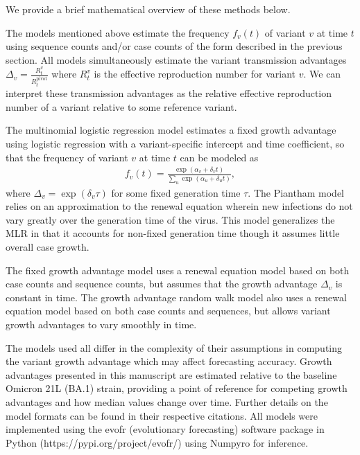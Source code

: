 \documentclass[11pt,oneside,letterpaper]{article}
\begin{document}
We provide a brief mathematical overview of these methods below.

The models mentioned above estimate the frequency  $f_{v}(t)$ of variant $v$ at time $t$ using sequence counts and/or case counts of the form described in the previous section.
All models simultaneously estimate the variant transmission advantages $\Delta_{v} = \frac{R_{t}^{v}}{R_{t}^{\text{pivot}}}$ where $R_{t}^{v}$ is the effective reproduction number for variant $v$.
We can interpret these transmission advantages as the relative effective reproduction number of a variant relative to some reference variant.

The multinomial logistic regression model estimates a fixed growth advantage using logistic regression with a variant-specific intercept and time coefficient, so that the frequency of variant $v$ at time $t$ can be modeled as
\begin{align*}
    f_{v}(t) = \frac{\exp(\alpha_{v} + \delta_{v} t)}{\sum_{u} \exp(\alpha_{u} + \delta_{u} t)},
\end{align*}
where $\Delta_{v} = \exp(\delta_{v} \tau)$ for some fixed generation time $\tau$.
The Piantham model relies on an approximation to the renewal equation wherein new infections do not vary greatly over the generation time of the virus.
This model generalizes the MLR in that it accounts for non-fixed generation time though it assumes little overall case growth. \cite{piantham2021estimating}

The fixed growth advantage model uses a renewal equation model based on both case counts and sequence counts, but assumes that the growth advantage $\Delta_{v}$ is constant in time. \cite{figgins_bedford_freq_dyn}
The growth advantage random walk model also uses a renewal equation model based on both case counts and sequences, but allows variant growth advantages to vary smoothly in time. \cite{figgins_bedford_freq_dyn}

The models used all differ in the complexity of their assumptions in computing the variant growth advantage which may affect forecasting accuracy.
Growth advantages presented in this manuscript are estimated relative to the baseline Omicron 21L (BA.1) strain, providing a point of reference for competing growth advantages and how median values change over time.
Further details on the model formats can be found in their respective citations.
All models were implemented using the evofr (evolutionary forecasting) software package in Python (https://pypi.org/project/evofr/) using Numpyro for inference.
\end{document}
